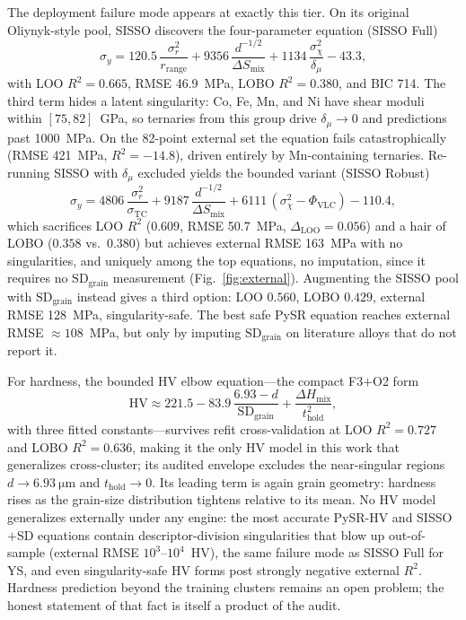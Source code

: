 \documentclass[5p,times,twocolumn]{elsarticle}
\begin{document}
The deployment failure mode appears at exactly this tier. On its original Oliynyk-style pool, SISSO discovers the four-parameter equation (SISSO Full)
\begin{equation}
\label{eq:sisso}
\sigma_y = 120.5\,\frac{\sigma_r^2}{r_\text{range}} + 9356\,\frac{d^{-1/2}}{\Delta S_\text{mix}} + 1134\,\frac{\sigma_\chi^2}{\delta_\mu} - 43.3,
\end{equation}
with LOO $R^2 = 0.665$, RMSE 46.9~\si{MPa}, LOBO $R^2 = 0.380$, and BIC 714.
The third term hides a latent singularity: Co, Fe, Mn, and Ni have shear moduli within $[75, 82]$~\si{GPa}, so ternaries from this group drive $\delta_\mu \to 0$ and predictions past 1000~\si{MPa}. On the 82-point external set the equation fails catastrophically (RMSE 421~\si{MPa}, $R^2 = -14.8$), driven entirely by Mn-containing ternaries. Re-running SISSO with $\delta_\mu$ excluded yields the bounded variant (SISSO Robust)
\begin{equation}
\label{eq:sisso_robust}
\sigma_y = 4806\,\frac{\sigma_r^2}{\sigma_\text{TC}} + 9187\,\frac{d^{-1/2}}{\Delta S_\text{mix}} + 6111\,(\sigma_\chi^2 - \Phi_\text{VLC}) - 110.4,
\end{equation}
which sacrifices LOO $R^2$ ($0.609$, RMSE 50.7~\si{MPa}, $\Delta_\text{LOO} = 0.056$) and a hair of LOBO ($0.358$ vs.\ $0.380$) but achieves external RMSE 163~\si{MPa} with no singularities, and uniquely among the top equations,  no imputation, since it requires no $\text{SD}_\text{grain}$ measurement (Fig.~\ref{fig:external}). Augmenting the SISSO pool with $\text{SD}_\text{grain}$ instead gives a third option: LOO $0.560$, LOBO $0.429$, external RMSE 128~\si{MPa}, singularity-safe.
The best safe PySR equation reaches external RMSE ${\approx}108$~\si{MPa}, but only by imputing $\text{SD}_\text{grain}$ on literature alloys that do not report it.

For hardness, the bounded HV elbow equation---the compact F3$+$O2 form
\begin{equation}
\label{eq:hv_elbow}
\text{HV} \approx 221.5 - 83.9\,\frac{6.93 - d}{\text{SD}_\text{grain}} + \frac{\Delta H_\text{mix}}{t_\text{hold}^2},
\end{equation}
with three fitted constants---survives refit cross-validation at LOO $R^2 = 0.727$ and LOBO $R^2 = 0.636$, making it the only HV model in this work that generalizes cross-cluster; its audited envelope excludes the near-singular regions $d \to 6.93~\si{\micro\meter}$ and $t_\text{hold} \to 0$. Its leading term is again grain geometry: hardness rises as the grain-size distribution tightens relative to its mean. No HV model generalizes externally under any engine: the most accurate PySR-HV and SISSO$+$SD equations contain descriptor-division singularities that blow up out-of-sample (external RMSE $10^3$--$10^4$~HV), the same failure mode as SISSO Full for YS, and even singularity-safe HV forms post strongly negative external $R^2$. Hardness prediction beyond the training clusters remains an open problem; the honest statement of that fact is itself a product of the audit.
\end{document}

